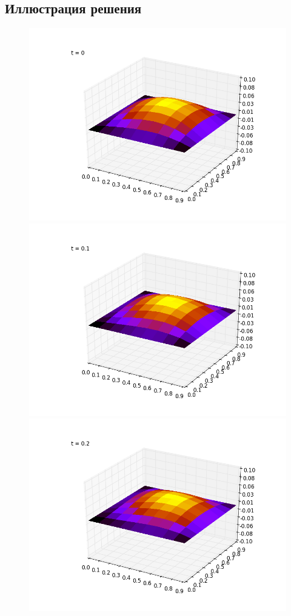 \documentclass[paper=a4, fontsize=13pt]{scrartcl} %
\numberwithin{equation}{section} %
\numberwithin{figure}{section} %
\numberwithin{table}{section} %
\begin{document}
\subsection{Иллюстрация решения}
\begin{figure}[!htb]
  \includegraphics[width=\linewidth]{0}
\endminipage\hfill
{}
  \includegraphics[width=\linewidth]{1}
\endminipage\hfill
{}%
  \includegraphics[width=\linewidth]{2}
\endminipage
\end{figure}
\end{document}
